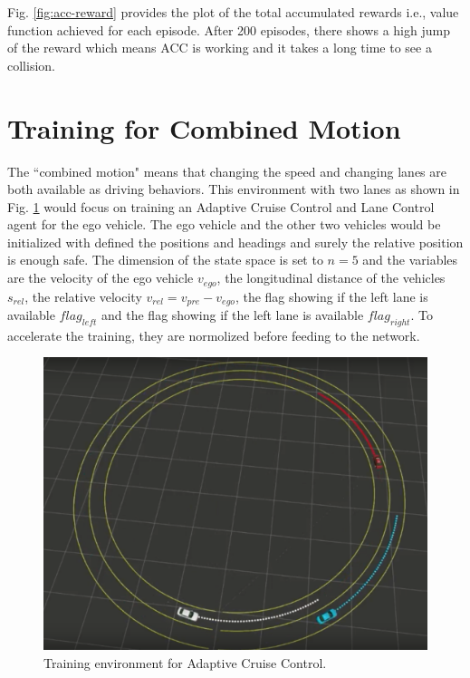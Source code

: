Fig. \ref{fig:acc-reward} provides the plot of the total accumulated rewards i.e., value function achieved for each episode. After 200 episodes, there shows a high jump of the reward which means ACC is working and it takes a long time to see a collision.

\section{Training for Combined Motion}

The ``combined motion" means that changing the speed and changing lanes are both available as driving behaviors. This environment with two lanes as shown in Fig. \ref{fig:auto-env} would focus on training an Adaptive Cruise Control and Lane Control agent for the ego vehicle. The ego vehicle and the other two vehicles would be initialized with defined the positions and headings and surely the relative position is enough safe. The dimension of the state space is set to $n = 5$ and the variables are the velocity of the ego vehicle $v_{ego}$, the longitudinal distance of the vehicles $s_{rel}$, the relative velocity $v_{rel} = v_{pre} - v_{ego}$, the flag showing if the left lane is available $flag_{left}$ and the flag showing if the left lane is available $flag_{right}$. To accelerate the training, they are normolized before feeding to the network.

\begin{figure}[h]
\centering
\includegraphics[width=1.0\textwidth]{figs/ch5/auto-env}
\caption{Training environment for Adaptive Cruise Control.}
\label{fig:auto-env}
\end{figure}


